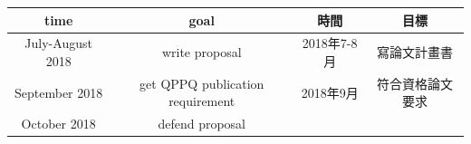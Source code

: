\documentclass[12pt,]{article}
\theoremstyle{definition}
\theoremstyle{definition}
\theoremstyle{definition}
\theoremstyle{remark}
\begin{document}
\begin{longtable}[]{@{}cccc@{}}
\toprule
\begin{minipage}[b]{0.20\columnwidth}\centering\strut
time\strut
\end{minipage} & \begin{minipage}[b]{0.26\columnwidth}\centering\strut
goal\strut
\end{minipage} & \begin{minipage}[b]{0.18\columnwidth}\centering\strut
時間\strut
\end{minipage} & \begin{minipage}[b]{0.24\columnwidth}\centering\strut
目標\strut
\end{minipage}\tabularnewline
\midrule
\endhead
\begin{minipage}[t]{0.20\columnwidth}\centering\strut
July-August 2018\strut
\end{minipage} & \begin{minipage}[t]{0.26\columnwidth}\centering\strut
write proposal\strut
\end{minipage} & \begin{minipage}[t]{0.18\columnwidth}\centering\strut
2018年7-8月\strut
\end{minipage} & \begin{minipage}[t]{0.24\columnwidth}\centering\strut
寫論文計畫書\strut
\end{minipage}\tabularnewline
\begin{minipage}[t]{0.20\columnwidth}\centering\strut
September 2018\strut
\end{minipage} & \begin{minipage}[t]{0.26\columnwidth}\centering\strut
get QPPQ publication requirement\strut
\end{minipage} & \begin{minipage}[t]{0.18\columnwidth}\centering\strut
2018年9月\strut
\end{minipage} & \begin{minipage}[t]{0.24\columnwidth}\centering\strut
符合資格論文要求\strut
\end{minipage}\tabularnewline
\begin{minipage}[t]{0.20\columnwidth}\centering\strut
October 2018\strut
\end{minipage} & \begin{minipage}[t]{0.26\columnwidth}\centering\strut
defend proposal\strut
\end{minipage} & \begin{minipage}[t]{0.18\columnwidth}\centering\strut

\end{minipage}
\end{longtable}
\end{document}
